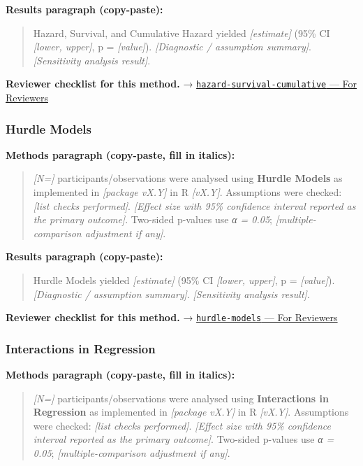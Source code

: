 \documentclass[
]{article}
\begin{document}
\textbf{Results paragraph (copy-paste):}

\begin{quote}
Hazard, Survival, and Cumulative Hazard yielded \emph{{[}estimate{]}}
(95\% CI \emph{{[}lower, upper{]}}, p = \emph{{[}value{]}}).
\emph{{[}Diagnostic / assumption summary{]}}. \emph{{[}Sensitivity
analysis result{]}}.
\end{quote}

\textbf{Reviewer checklist for this method.} →
\href{../chapters/11-survival/hazard-survival-cumulative.Rmd\#for-reviewers}{\texttt{hazard-survival-cumulative}
--- For Reviewers}

\subsubsection{Hurdle Models}\label{hurdle-models}

\textbf{Methods paragraph (copy-paste, fill in italics):}

\begin{quote}
\emph{{[}N={]}} participants/observations were analysed using
\textbf{Hurdle Models} as implemented in \emph{{[}package vX.Y{]}} in R
\emph{{[}vX.Y{]}}. Assumptions were checked: \emph{{[}list checks
performed{]}}. \emph{{[}Effect size with 95\% confidence interval
reported as the primary outcome{]}}. Two-sided p-values use \emph{α =
0.05}; \emph{{[}multiple-comparison adjustment if any{]}}.
\end{quote}

\textbf{Results paragraph (copy-paste):}

\begin{quote}
Hurdle Models yielded \emph{{[}estimate{]}} (95\% CI \emph{{[}lower,
upper{]}}, p = \emph{{[}value{]}}). \emph{{[}Diagnostic / assumption
summary{]}}. \emph{{[}Sensitivity analysis result{]}}.
\end{quote}

\textbf{Reviewer checklist for this method.} →
\href{../chapters/07-regression/hurdle-models.Rmd\#for-reviewers}{\texttt{hurdle-models}
--- For Reviewers}

\subsubsection{Interactions in
Regression}\label{interactions-in-regression}

\textbf{Methods paragraph (copy-paste, fill in italics):}

\begin{quote}
\emph{{[}N={]}} participants/observations were analysed using
\textbf{Interactions in Regression} as implemented in \emph{{[}package
vX.Y{]}} in R \emph{{[}vX.Y{]}}. Assumptions were checked: \emph{{[}list
checks performed{]}}. \emph{{[}Effect size with 95\% confidence interval
reported as the primary outcome{]}}. Two-sided p-values use \emph{α =
0.05}; \emph{{[}multiple-comparison adjustment if any{]}}.
\end{quote}
\end{document}

